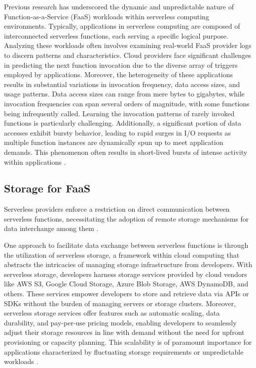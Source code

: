 Previous research has underscored the dynamic and unpredictable nature of Function-as-a-Service (FaaS) workloads within serverless computing environments. Typically, applications in serverless computing are composed of interconnected serverless functions, each serving a specific logical purpose. Analyzing these workloads often involves examining real-world FaaS provider logs to discern patterns and characteristics. Cloud providers face significant challenges in predicting the next function invocation due to the diverse array of triggers employed by applications. Moreover, the heterogeneity of these applications results in substantial variations in invocation frequency, data access sizes, and usage patterns. Data access sizes can range from mere bytes to gigabytes, while invocation frequencies can span several orders of magnitude, with some functions being infrequently called. Learning the invocation patterns of rarely invoked functions is particularly challenging. Additionally, a significant portion of data accesses exhibit bursty behavior, leading to rapid surges in I/O requests as multiple function instances are dynamically spun up to meet application demands. This phenomenon often results in short-lived bursts of intense activity within applications \cite{shahrad2020serverless,romero2021faat,klimovic2018pocket}.

\subsection{Storage for FaaS}

Serverless providers enforce a restriction on direct communication between serverless functions, necessitating the adoption of remote storage mechanisms for data interchange among them \cite{jonas2019cloud,klimovic2018pocket,romero2021faat}.

One approach to facilitate data exchange between serverless functions is through the utilization of serverless storage, a framework within cloud computing that abstracts the intricacies of managing storage infrastructure from developers. With serverless storage, developers harness storage services provided by cloud vendors like AWS S3, Google Cloud Storage, Azure Blob Storage, AWS DynamoDB, and others. These services empower developers to store and retrieve data via APIs or SDKs without the burden of managing servers or storage clusters. Moreover, serverless storage services offer features such as automatic scaling, data durability, and pay-per-use pricing models, enabling developers to seamlessly adjust their storage resources in line with demand without the need for upfront provisioning or capacity planning. This scalability is of paramount importance for applications characterized by fluctuating storage requirements or unpredictable workloads  \cite{CloudObj90:online,AmazonDy45:online,DeCandia2007,AzureBlo83:online,CloudSto52:online,Datastor50:online,AzureCos63:online}.

